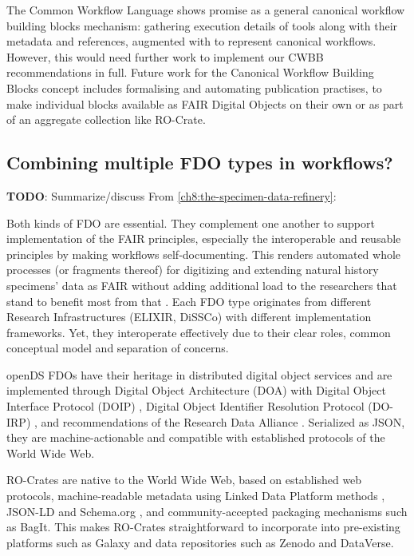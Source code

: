 The Common Workflow Language shows promise as a general canonical
workflow building blocks mechanism: gathering execution details of tools
along with their metadata and references, augmented with
 to represent canonical workflows. However, this would need
further work to implement our CWBB recommendations in full. Future work
for the Canonical Workflow Building Blocks concept includes formalising
and automating publication practises, to make individual blocks
available as FAIR Digital Objects on their own or as part of an
aggregate collection like RO-Crate.



\subsection{Combining multiple FDO types in workflows?}

\textbf{TODO}: Summarize/discuss 
From \vref{ch8:the-specimen-data-refinery}:



Both kinds of FDO are essential. They complement one another to support
implementation of the FAIR principles, especially the interoperable and
reusable principles by making workflows self-documenting. This renders
automated whole processes (or fragments thereof) for digitizing and
extending natural history specimens' data as FAIR without adding
additional load to the researchers that stand to benefit most from that
\cite{ch8-27}. Each FDO type originates from different Research
Infrastructures (ELIXIR, DiSSCo) with different implementation
frameworks. Yet, they interoperate effectively due to their clear roles,
common conceptual model and separation of concerns.


openDS FDOs have their heritage in distributed digital object services
\cite{ch8-46} and are implemented through Digital Object Architecture (DOA)
\cite{ch8-62} with Digital Object Interface Protocol (DOIP) \cite{DONA 2018}, Digital
Object Identifier Resolution Protocol (DO-IRP) \cite{rfc3652}, and
recommendations of the Research Data Alliance \cite{ch8-65}. Serialized as
JSON, they are machine-actionable and compatible with established
protocols of the World Wide Web.

RO-Crates are native to the World Wide Web, based on established web
protocols, machine-readable metadata using Linked Data Platform methods
\cite{ch8-66}, JSON-LD and Schema.org \cite{Bechhofer 2013}, and community-accepted
packaging mechanisms such as BagIt. This makes RO-Crates straightforward
to incorporate into pre-existing platforms such as Galaxy and data
repositories such as Zenodo and DataVerse.

